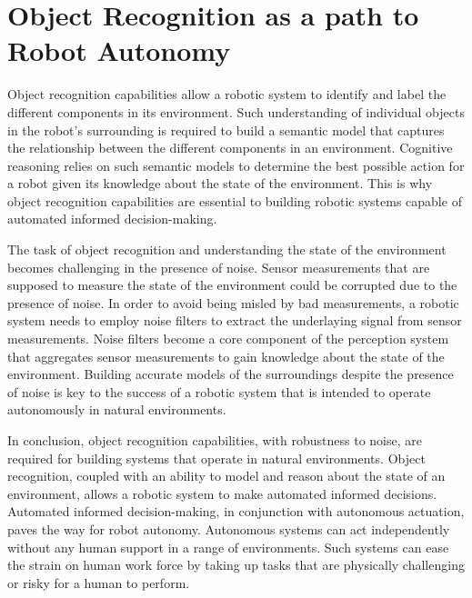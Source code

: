 \documentclass {udthesis}
\begin{document}
\section{Object Recognition as a path to Robot Autonomy}

Object recognition capabilities allow a robotic system to identify and label the different components in its environment. Such understanding of individual objects in the robot's surrounding is required to build a semantic model that captures the relationship between the different components in an environment.
Cognitive reasoning relies on such semantic models to determine the best possible action for a robot given its knowledge about the state of the environment. This is why object recognition capabilities are essential to building robotic systems capable of automated informed decision-making.

The task of object recognition and understanding the state of the environment becomes challenging in the presence of noise. Sensor measurements
that are supposed to measure the state of the environment could be corrupted due to the presence of noise. In order to avoid being misled by bad measurements,
a robotic system needs to employ noise filters to extract the underlaying signal from sensor measurements. Noise filters become a core component of the perception system that aggregates sensor measurements to gain knowledge about the state of the environment. Building accurate models of the surroundings despite the presence of noise is key to the success of a robotic system that is intended to operate autonomously in natural environments.

In conclusion, object recognition capabilities, with robustness to noise, are required for building systems that operate in natural environments. Object recognition, coupled with an ability to model and reason about the state of an environment, allows a robotic system to make automated informed decisions. Automated informed decision-making, in conjunction with autonomous actuation, paves the way for robot autonomy. Autonomous systems can act independently without any human support in a range of environments. Such systems can ease the strain on human work force by taking up tasks that are physically challenging or risky for a human to perform.

\end{document}
